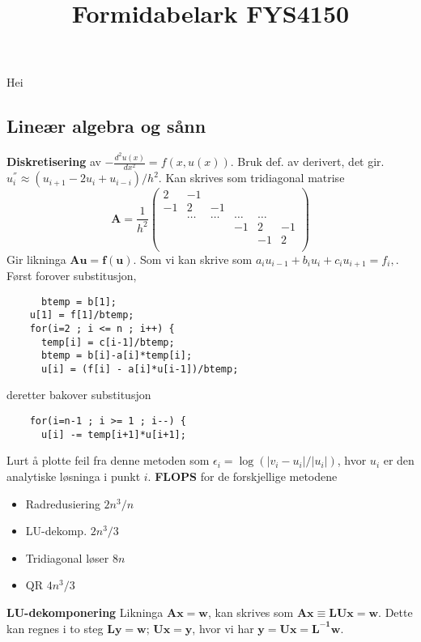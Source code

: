 \documentclass[12pt,a4paper,twocolumn]{article}
\title{Formidabelark FYS4150}
\begin{document}
\maketitle
\tableofcontents
\begin{flushleft} %
Hei
\subsection{Lineær algebra og sånn} %
\label{sub:linalg}
\textbf{Diskretisering} av $-\frac{d^2u(x)}{dx^2} = f(x,u(x))$. Bruk def. av derivert, det gir. $u^{''}_i \approx  (u_{i+1} -2u_i +u_{i-i})/h^2.$ Kan skrives som tridiagonal matrise
\begin{equation*}
\mathbf{A} = \frac{1}{h^2}\left(\begin{array}{cccccc}
2 & -1 &  &   &  & \\
-1 & 2 & -1 & & & \\
& \dots   & \dots &\dots   &\dots & \\
&   &  &-1  &2& -1 \\
&    &  &   &-1 & 2 \\
\end{array} \right)	
\end{equation*}
Gir likninga $\mathbf{A}\mathbf{u} = \mathbf{f}(\mathbf{u}).$ Som vi kan skrive som $a_iu_{i-1}+b_iu_i+c_iu_{i+1} = f_i,$. Først forover substitusjon,
\begin{verbatim}
	  btemp = b[1];
    u[1] = f[1]/btemp;
    for(i=2 ; i <= n ; i++) {
      temp[i] = c[i-1]/btemp;
      btemp = b[i]-a[i]*temp[i];
      u[i] = (f[i] - a[i]*u[i-1])/btemp;
\end{verbatim}
deretter bakover substitusjon
\begin{verbatim}
	for(i=n-1 ; i >= 1 ; i--) {
      u[i] -= temp[i+1]*u[i+1];
\end{verbatim}
Lurt å plotte feil fra denne metoden som $\epsilon_i = \log(|v_i-u_i|/|u_i|)$, hvor $u_i$ er den analytiske løsninga i punkt $i$.
\textbf{FLOPS} for de forskjellige metodene
\begin{itemize}
	\item Radredusiering $2n^3/n$
	\item LU-dekomp. $2n^3/3$
	\item Tridiagonal løser $8n$ 
	\item QR $4n^3/3$
\end{itemize}
\textbf{LU-dekomponering} Likninga $\mathbf{Ax}=\mathbf{w}$, kan skrives som $\mathbf{A} \mathbf{x} \equiv \mathbf{L} \mathbf{U} \mathbf{x} =\mathbf{w}$. Dette kan regnes i to steg $\mathbf{L} \mathbf{y} = \mathbf{w};\, \mathbf{Ux}=\mathbf{y}$, hvor vi har $\mathbf{y}=\mathbf{Ux}=\mathbf{L^{-1}w}$.\\

\end{flushleft}
\end{document}
